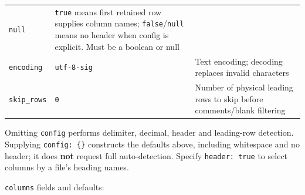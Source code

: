 \documentclass[
  10pt,
  a4paper,
  oneside]{scrreprt}
\begin{document}
\begin{longtable}[]{@{}lll@{}}
\begin{minipage}[t]{0.30\columnwidth}
\texttt{null}\strut
\end{minipage} & \begin{minipage}[t]{0.30\columnwidth}\raggedright
\texttt{true} means first retained row supplies column names;
\texttt{false}/\texttt{null} means no header when config is explicit.
Must be a boolean or null\strut
\end{minipage}\tabularnewline
\begin{minipage}[t]{0.30\columnwidth}\raggedright
\texttt{encoding}\strut
\end{minipage} & \begin{minipage}[t]{0.30\columnwidth}\raggedright
\texttt{utf-8-sig}\strut
\end{minipage} & \begin{minipage}[t]{0.30\columnwidth}\raggedright
Text encoding; decoding replaces invalid characters\strut
\end{minipage}\tabularnewline
\begin{minipage}[t]{0.30\columnwidth}\raggedright
\texttt{skip\_rows}\strut
\end{minipage} & \begin{minipage}[t]{0.30\columnwidth}\raggedright
\texttt{0}\strut
\end{minipage} & \begin{minipage}[t]{0.30\columnwidth}\raggedright
Number of physical leading rows to skip before comments/blank
filtering\strut
\end{minipage}\tabularnewline
\bottomrule
\end{longtable}

Omitting \texttt{config} performs delimiter, decimal, header and
leading-row detection. Supplying \texttt{config:\ \{\}} constructs the
defaults above, including whitespace and no header; it does \textbf{not}
request full auto-detection. Specify \texttt{header:\ true} to select
columns by a file's heading names.

\texttt{columns} fields and defaults:
\end{document}
